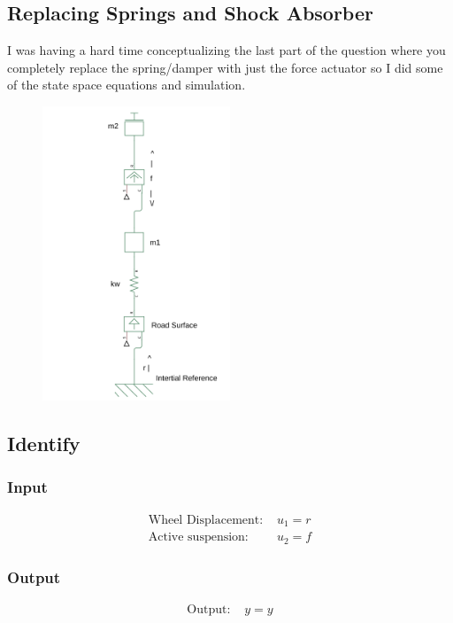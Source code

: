 \documentclass{article}
\begin{document}
\subsection*{Replacing Springs and Shock Absorber}

I was having a hard time conceptualizing the last part of the question where you completely replace the spring/damper with just the force actuator so I did some of the state space equations and simulation.

\begin{figure}[H]
    \centering
    \includegraphics[width=0.5\textwidth]{actSusOnlyModel.png}
\end{figure}

\subsection{Identify}
\subsubsection{Input}
\begin{align*}
\text{Wheel Displacement: } & u_1 = r \\
\text{Active suspension: } & u_2 = f
\end{align*}

\subsubsection{Output}
\begin{align*}
\text{Output: } & y = y
\end{align*}
\end{document}
